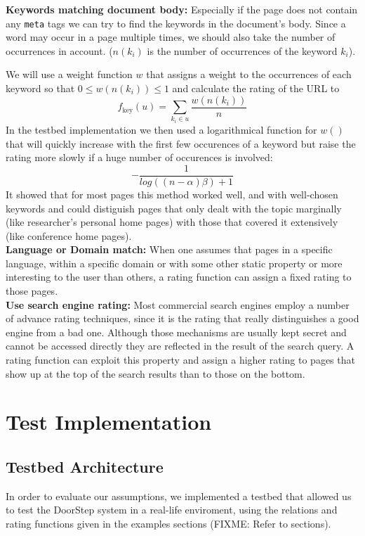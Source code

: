 \documentclass[a4paper]{danarticle}
\theoremstyle{remark}
\begin{document}
    \textbf{Keywords matching document body:} Especially if the page does not
    contain any \verb$meta$ tags we can try to find the keywords in the
    document's body. Since a word may occur in a page multiple times, we should
    also take the number of occurrences in account. ($ n(k_i) $ is the number of
    occurrences of the keyword $ k_i $).
    
    We will use a weight function $ w $ that assigns a weight to the occurrences
    of each keyword so that $ 0 \leq w(n(k_i)) \leq 1 $ and calculate the
    rating of the URL to
    \[
      f_{\mbox{key}}(u) = \sum_{k_i \in u} \frac{w(n(k_i))}{n}
    \]
    In the testbed implementation we then used a logarithmical function for 
    $w()$ that will quickly increase with the first few occurences of a 
    keyword but raise the rating more slowly if a huge number of occurences is 
    involved:
    \[
      - \frac{1}{log((n - \alpha) \beta) + 1}
    \]
    It showed that for most pages this method worked well, and with well-chosen 
    keywords and could distiguish pages that only dealt with the topic 
    marginally (like researcher's personal home pages) with those that covered 
    it extensively (like conference home pages).
    \\
    
    \textbf{Language or Domain match:} When one assumes that pages in a specific 
    language, within a specific domain or with some other static property or 
    more interesting to the user than others, a rating function can assign a 
    fixed rating to those pages.
    \\
    
    \textbf{Use search engine rating:} Most commercial search engines employ a 
    number of advance rating techniques, since it is the rating that really 
    distinguishes a good engine from a bad one. Although those mechanisms are 
    usually kept secret and cannot be accessed directly they are reflected in 
    the result of the search query. A rating function can exploit this property 
    and assign a higher rating to pages that show up at the top of the search 
    results than to those on the bottom.
  \section{Test Implementation}
    \subsection{Testbed Architecture}
      In order to evaluate our assumptions, we implemented a testbed that 
      allowed us to test the DoorStep system in a real-life enviroment, using 
      the relations and rating functions given in the examples sections (FIXME: 
      Refer to sections).
      
\end{document}
